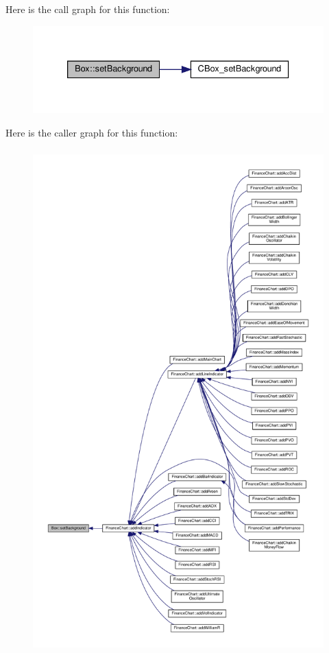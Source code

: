 Here is the call graph for this function\+:
\nopagebreak
\begin{figure}[H]
\begin{center}
\leavevmode
\includegraphics[width=333pt]{class_box_ac1dd2cb9848de34cf3687a25821fd228_cgraph}
\end{center}
\end{figure}
Here is the caller graph for this function\+:
\nopagebreak
\begin{figure}[H]
\begin{center}
\leavevmode
\includegraphics[height=550pt]{class_box_ac1dd2cb9848de34cf3687a25821fd228_icgraph}
\end{center}
\end{figure}
\mbox{\label{class_box_ac8dde107dbf1f30374b7c037185fe486}} 
